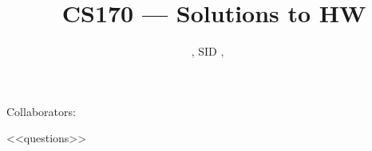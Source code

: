 \documentclass[11pt]{article}
\title{\Session\ CS170 --- Solutions to HW \Homework}
\author{\Name, SID \SID, \texttt{\Login}}
\begin{document}
\maketitle

Collaborators:

<<questions>>
\end{document}
